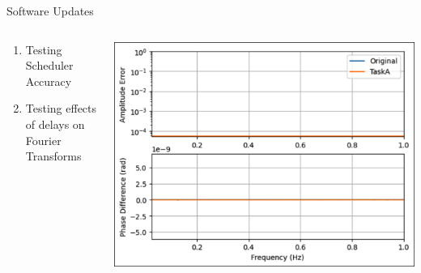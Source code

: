 \begin{frame}{Software Updates}
    \begin{columns}
        \begin{column}{0.5\textwidth}
            \begin{enumerate}
                \item Testing Scheduler Accuracy
                \item Testing effects of delays on Fourier Transforms
            \end{enumerate}
        \end{column}
        \begin{column}{0.5\textwidth}
            \includegraphics[height=1\textheight,width=1\textwidth,keepaspectratio]{images/Fourier-no-delay.png}
        \end{column}
    \end{columns}
    
\end{frame}




